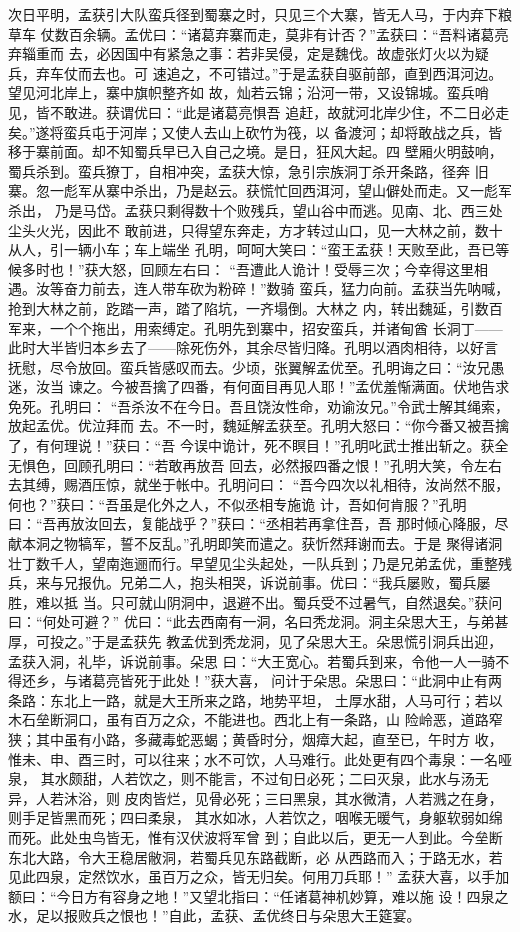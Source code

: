 次日平明，孟获引大队蛮兵径到蜀寨之时，只见三个大寨，皆无人马，于内弃下粮草车
仗数百余辆。孟优曰：“诸葛弃寨而走，莫非有计否？”孟获曰：“吾料诸葛亮弃辎重而
去，必因国中有紧急之事：若非吴侵，定是魏伐。故虚张灯火以为疑兵，弃车仗而去也。可
速追之，不可错过。”于是孟获自驱前部，直到西洱河边。望见河北岸上，寨中旗帜整齐如
故，灿若云锦；沿河一带，又设锦城。蛮兵哨见，皆不敢进。获谓优曰：“此是诸葛亮惧吾
追赶，故就河北岸少住，不二日必走矣。”遂将蛮兵屯于河岸；又使人去山上砍竹为筏，以
备渡河；却将敢战之兵，皆移于寨前面。却不知蜀兵早已入自己之境。是日，狂风大起。四
壁厢火明鼓响，蜀兵杀到。蛮兵獠丁，自相冲突，孟获大惊，急引宗族洞丁杀开条路，径奔
旧寨。忽一彪军从寨中杀出，乃是赵云。获慌忙回西洱河，望山僻处而走。又一彪军杀出，
乃是马岱。孟获只剩得数十个败残兵，望山谷中而逃。见南、北、西三处尘头火光，因此不
敢前进，只得望东奔走，方才转过山口，见一大林之前，数十从人，引一辆小车；车上端坐
孔明，呵呵大笑曰：“蛮王孟获！天败至此，吾已等候多时也！”获大怒，回顾左右曰：
“吾遭此人诡计！受辱三次；今幸得这里相遇。汝等奋力前去，连人带车砍为粉碎！”数骑
蛮兵，猛力向前。孟获当先呐喊，抢到大林之前，趷踏一声，踏了陷坑，一齐塌倒。大林之
内，转出魏延，引数百军来，一个个拖出，用索缚定。孔明先到寨中，招安蛮兵，并诸甸酋
长洞丁——此时大半皆归本乡去了——除死伤外，其余尽皆归降。孔明以酒肉相待，以好言
抚慰，尽令放回。蛮兵皆感叹而去。少顷，张翼解孟优至。孔明诲之曰：“汝兄愚迷，汝当
谏之。今被吾擒了四番，有何面目再见人耶！”孟优羞惭满面。伏地告求免死。孔明曰：
“吾杀汝不在今日。吾且饶汝性命，劝谕汝兄。”令武士解其绳索，放起孟优。优泣拜而
去。不一时，魏延解孟获至。孔明大怒曰：“你今番又被吾擒了，有何理说！”获曰：“吾
今误中诡计，死不瞑目！”孔明叱武士推出斩之。获全无惧色，回顾孔明曰：“若敢再放吾
回去，必然报四番之恨！”孔明大笑，令左右去其缚，赐酒压惊，就坐于帐中。孔明问曰：
“吾今四次以礼相待，汝尚然不服，何也？”获曰：“吾虽是化外之人，不似丞相专施诡
计，吾如何肯服？”孔明曰：“吾再放汝回去，复能战乎？”获曰：“丞相若再拿住吾，吾
那时倾心降服，尽献本洞之物犒军，誓不反乱。”孔明即笑而遣之。获忻然拜谢而去。于是
聚得诸洞壮丁数千人，望南迤逦而行。早望见尘头起处，一队兵到；乃是兄弟孟优，重整残
兵，来与兄报仇。兄弟二人，抱头相哭，诉说前事。优曰：“我兵屡败，蜀兵屡胜，难以抵
当。只可就山阴洞中，退避不出。蜀兵受不过暑气，自然退矣。”获问曰：“何处可避？”
优曰：“此去西南有一洞，名曰秃龙洞。洞主朵思大王，与弟甚厚，可投之。”于是孟获先
教孟优到秃龙洞，见了朵思大王。朵思慌引洞兵出迎，孟获入洞，礼毕，诉说前事。朵思
曰：“大王宽心。若蜀兵到来，令他一人一骑不得还乡，与诸葛亮皆死于此处！”获大喜，
问计于朵思。朵思曰：“此洞中止有两条路：东北上一路，就是大王所来之路，地势平坦，
土厚水甜，人马可行；若以木石垒断洞口，虽有百万之众，不能进也。西北上有一条路，山
险岭恶，道路窄狭；其中虽有小路，多藏毒蛇恶蝎；黄昏时分，烟瘴大起，直至已，午时方
收，惟未、申、酉三时，可以往来；水不可饮，人马难行。此处更有四个毒泉：一名哑泉，
其水颇甜，人若饮之，则不能言，不过旬日必死；二曰灭泉，此水与汤无异，人若沐浴，则
皮肉皆烂，见骨必死；三曰黑泉，其水微清，人若溅之在身，则手足皆黑而死；四曰柔泉，
其水如冰，人若饮之，咽喉无暖气，身躯软弱如绵而死。此处虫鸟皆无，惟有汉伏波将军曾
到；自此以后，更无一人到此。今垒断东北大路，令大王稳居敝洞，若蜀兵见东路截断，必
从西路而入；于路无水，若见此四泉，定然饮水，虽百万之众，皆无归矣。何用刀兵耶！”
孟获大喜，以手加额曰：“今日方有容身之地！”又望北指曰：“任诸葛神机妙算，难以施
设！四泉之水，足以报败兵之恨也！”自此，孟获、孟优终日与朵思大王筵宴。

